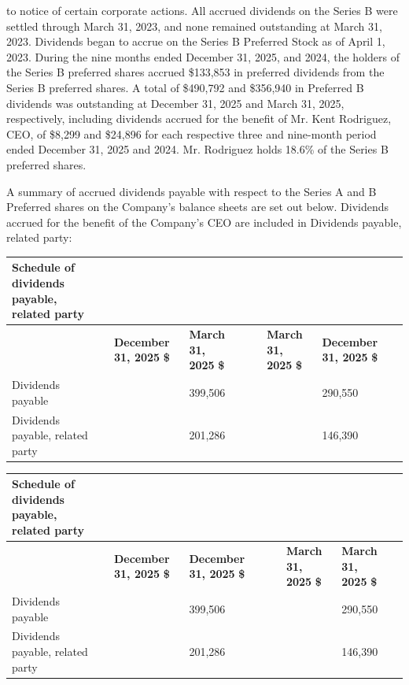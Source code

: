 \documentclass[11pt,a4paper]{article}
\begin{document}
to notice of certain corporate actions. All accrued dividends on the Series B were settled through March 31, 2023, and none remained outstanding at March 31, 2023. Dividends began to accrue on the Series B Preferred Stock as of April 1, 2023. During the nine months ended December 31, 2025, and 2024, the holders of the Series B preferred shares accrued \$133,853 in preferred dividends from the Series B preferred shares. A total of \$490,792 and \$356,940 in Preferred B dividends was outstanding at December 31, 2025 and March 31, 2025, respectively, including dividends accrued for the benefit of Mr. Kent Rodriguez, CEO, of \$8,299 and \$24,896 for each respective three and nine-month period ended December 31, 2025 and 2024. Mr. Rodriguez holds 18.6\% of the Series B preferred shares.

A summary of accrued dividends payable with respect to the Series A and B Preferred shares on the Company's balance sheets are set out below. Dividends accrued for the benefit of the Company's CEO are included in Dividends payable, related party:

\begin{table}[h]
\begin{tabular}{|l|l|l|l|l|l|l|l|l|}
\hline
Schedule of dividends payable, related party &  &  &  &  &  &  &  &  \\ \hline
 &  & \textbf{December 31, 2025}  \textbf{\$} & \textbf{March 31, 2025}  \textbf{\$} &  &  & \textbf{March 31, 2025}  \textbf{\$} & \textbf{December 31, 2025}  \textbf{\$} &  \\ \hline
Dividends payable &  &  & 399,506 &  &  &  & 290,550 &  \\ \hline
Dividends payable, related party &  &  & 201,286 &  &  &  & 146,390 &  \\ \hline
\end{tabular}
\end{table}

\begin{table}[h]
\begin{tabular}{|l|l|l|l|l|l|l|l|l|}
\hline
Schedule of dividends payable, related party &  &  &  &  &  &  &  &  \\ \hline
 &  & \textbf{December 31, 2025}  \textbf{\$} & \textbf{December 31, 2025}  \textbf{\$} &  &  & \textbf{March 31, 2025}  \textbf{\$} & \textbf{March 31, 2025}  \textbf{\$} &  \\ \hline
Dividends payable &  &  & 399,506 &  &  &  & 290,550 &  \\ \hline
Dividends payable, related party &  &  & 201,286 &  &  &  & 146,390 &  \\ \hline
\end{tabular}
\end{table}
\end{document}
